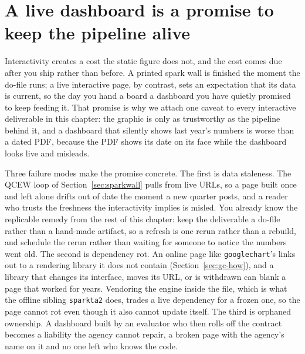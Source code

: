 \documentclass[
    a4paper,
    fontsize=10pt,
    twoside=true,
    numbers=noenddot,
]{kaobook}
\begin{document}
\section{A live dashboard is a promise to keep the pipeline alive}\label{ch10-sec:maintenance}
Interactivity creates a cost the static figure does not, and the cost comes due after you ship rather than before. A printed spark wall is finished the moment the do-file runs; a live interactive page, by contrast, sets an expectation that its data is current, so the day you hand a board a dashboard you have quietly promised to keep feeding it. That promise is why we attach one caveat to every interactive deliverable in this chapter: the graphic is only as trustworthy as the pipeline behind it, and a dashboard that silently shows last year's numbers is worse than a dated PDF, because the PDF shows its date on its face while the dashboard looks live and misleads.

Three failure modes make the promise concrete. The first is data staleness. The QCEW loop of Section~\ref{sec:sparkwall} pulls from live URLs, so a page built once and left alone drifts out of date the moment a new quarter posts, and a reader who trusts the freshness the interactivity implies is misled. You already know the replicable remedy from the rest of this chapter: keep the deliverable a do-file rather than a hand-made artifact, so a refresh is one rerun rather than a rebuild, and schedule the rerun rather than waiting for someone to notice the numbers went old. The second is dependency rot. An online page like \texttt{googlechart}'s links out to a rendering library it does not contain (Section~\ref{sec:gc-how}), and a library that changes its interface, moves its URL, or is withdrawn can blank a page that worked for years. Vendoring the engine inside the file, which is what the offline sibling \texttt{sparkta2} does, trades a live dependency for a frozen one, so the page cannot rot even though it also cannot update itself. The third is orphaned ownership. A dashboard built by an evaluator who then rolls off the contract becomes a liability the agency cannot repair, a broken page with the agency's name on it and no one left who knows the code.
\end{document}

